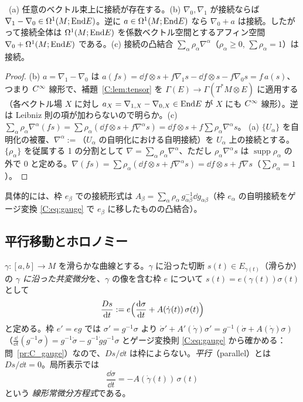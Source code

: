 \begin{thm}[接続の存在とアフィン構造]\label{C:thm:affine}\tP\
(a) 任意のベクトル束上に接続が存在する。(b) $\nabla_0,\nabla_1$ が接続ならば $\nabla_1-\nabla_0\in\Omega^1(M;\mathrm{End} E)$。逆に $a\in\Omega^1(M;\mathrm{End} E)$ なら $\nabla_0+a$ は接続。したがって接続全体は $\Omega^1(M;\mathrm{End} E)$ を係数ベクトル空間とするアフィン空間 $\nabla_0+\Omega^1(M;\mathrm{End} E)$ である。(c) 接続の凸結合 $\sum_\alpha\rho_\alpha\nabla^\alpha$（$\rho_\alpha\ge0$, $\sum\rho_\alpha=1$）は接続。
\end{thm}
\begin{proof}
(b) $a=\nabla_1-\nabla_0$ は $a(fs)=\dd f\otimes s+f\nabla_1s-\dd f\otimes s-f\nabla_0s=f\,a(s)$、つまり $C^\infty$ 線形で、補題~\ref{C:lem:tensor} を $\Gamma(E)\to\Gamma(T^*M\otimes E)$ に適用する（各ベクトル場 $X$ に対し $a_X=\nabla_{1,X}-\nabla_{0,X}\in\mathrm{End} E$ が $X$ にも $C^\infty$ 線形）。逆は Leibniz 則の項が加わらないので明らか。(c) $\sum_\alpha\rho_\alpha\nabla^\alpha(fs)=\sum\rho_\alpha(\dd f\otimes s+f\nabla^\alpha s)=\dd f\otimes s+f\sum\rho_\alpha\nabla^\alpha s$。
(a) $\{U_\alpha\}$ を自明化の被覆、$\nabla^\alpha:=$（$U_\alpha$ の自明化における自明接続）を $U_\alpha$ 上の接続とする。$\{\rho_\alpha\}$ を従属する 1 の分割として $\nabla=\sum_\alpha\rho_\alpha\nabla^\alpha$、ただし $\rho_\alpha\nabla^\alpha s$ は $\operatorname{supp}\rho_\alpha$ の外で $0$ と定める。$\nabla(fs)=\sum\rho_\alpha(\dd f\otimes s+f\nabla^\alpha s)=\dd f\otimes s+f\nabla s$（$\sum\rho_\alpha=1$）。
\end{proof}
具体的には、枠 $e_\beta$ での接続形式は $A_\beta=\sum_\alpha\rho_\alpha\,g_{\alpha\beta}^{-1}\dd g_{\alpha\beta}$（枠 $e_\alpha$ の自明接続をゲージ変換 \eqref{C:eq:gauge} で $e_\beta$ に移したものの凸結合）。

\subsection{平行移動とホロノミー}
\label{C:ss:PT}
$\gamma:[a,b]\to M$ を滑らかな曲線とする。$\gamma$ に沿った切断 $s(t)\in E_{\gamma(t)}$（滑らか）の \emph{$\gamma$ に沿った共変微分}を、$\gamma$ の像を含む枠 $e$ について $s(t)=e(\gamma(t))\sigma(t)$ として
\[
\frac{D s}{\mathrm{d} t}:=e\Bigl(\frac{\mathrm{d}\sigma}{\mathrm{d} t}+A(\dot\gamma(t))\,\sigma(t)\Bigr)
\]
と定める。枠 $e'=eg$ では $\sigma'=g^{-1}\sigma$ より $\dot\sigma'+A'(\dot\gamma)\sigma'=g^{-1}(\dot\sigma+A(\dot\gamma)\sigma)$（$\frac{\dd}{\dd t}(g^{-1}\sigma)=g^{-1}\dot\sigma-g^{-1}\dot gg^{-1}\sigma$ とゲージ変換則 \eqref{C:eq:gauge} から確かめる：問~\ref{pr:C_gauge}）なので、$Ds/\dd t$ は枠によらない。\emph{平行}（parallel）とは $Ds/\dd t=0$。局所表示では
\begin{equation}\label{C:eq:parallel}
\frac{\dd\sigma}{\dd t}=-A(\dot\gamma(t))\,\sigma(t)
\end{equation}
という \emph{線形常微分方程式}である。

